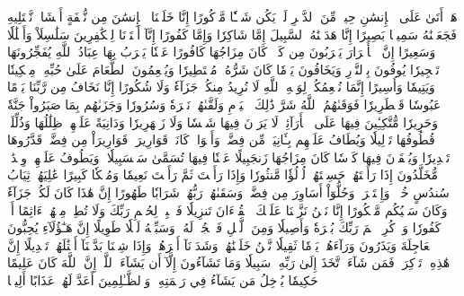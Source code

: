 هَلۡ أَتَىٰ عَلَى ٱلۡإِنسَٰنِ حِينٞ مِّنَ ٱلدَّهۡرِ لَمۡ يَكُن شَيۡـٔٗا مَّذۡكُورًا
إِنَّا خَلَقۡنَا ٱلۡإِنسَٰنَ مِن نُّطۡفَةٍ أَمۡشَاجٖ نَّبۡتَلِيهِ فَجَعَلۡنَٰهُ سَمِيعَۢا بَصِيرًا
إِنَّا هَدَيۡنَٰهُ ٱلسَّبِيلَ إِمَّا شَاكِرٗا وَإِمَّا كَفُورًا
إِنَّآ أَعۡتَدۡنَا لِلۡكَٰفِرِينَ سَلَٰسِلَاْ وَأَغۡلَٰلٗا وَسَعِيرًا
إِنَّ ٱلۡأَبۡرَارَ يَشۡرَبُونَ مِن كَأۡسٖ كَانَ مِزَاجُهَا كَافُورًا
عَيۡنٗا يَشۡرَبُ بِهَا عِبَادُ ٱللَّهِ يُفَجِّرُونَهَا تَفۡجِيرٗا
يُوفُونَ بِٱلنَّذۡرِ وَيَخَافُونَ يَوۡمٗا كَانَ شَرُّهُۥ مُسۡتَطِيرٗا
وَيُطۡعِمُونَ ٱلطَّعَامَ عَلَىٰ حُبِّهِۦ مِسۡكِينٗا وَيَتِيمٗا وَأَسِيرًا
إِنَّمَا نُطۡعِمُكُمۡ لِوَجۡهِ ٱللَّهِ لَا نُرِيدُ مِنكُمۡ جَزَآءٗ وَلَا شُكُورًا
إِنَّا نَخَافُ مِن رَّبِّنَا يَوۡمًا عَبُوسٗا قَمۡطَرِيرٗا
فَوَقَىٰهُمُ ٱللَّهُ شَرَّ ذَٰلِكَ ٱلۡيَوۡمِ وَلَقَّىٰهُمۡ نَضۡرَةٗ وَسُرُورٗا
وَجَزَىٰهُم بِمَا صَبَرُواْ جَنَّةٗ وَحَرِيرٗا
مُّتَّكِـِٔينَ فِيهَا عَلَى ٱلۡأَرَآئِكِۖ لَا يَرَوۡنَ فِيهَا شَمۡسٗا وَلَا زَمۡهَرِيرٗا
وَدَانِيَةً عَلَيۡهِمۡ ظِلَٰلُهَا وَذُلِّلَتۡ قُطُوفُهَا تَذۡلِيلٗا
وَيُطَافُ عَلَيۡهِم بِـَٔانِيَةٖ مِّن فِضَّةٖ وَأَكۡوَابٖ كَانَتۡ قَوَارِيرَا۠
قَوَارِيرَاْ مِن فِضَّةٖ قَدَّرُوهَا تَقۡدِيرٗا
وَيُسۡقَوۡنَ فِيهَا كَأۡسٗا كَانَ مِزَاجُهَا زَنجَبِيلًا
عَيۡنٗا فِيهَا تُسَمَّىٰ سَلۡسَبِيلٗا
۞وَيَطُوفُ عَلَيۡهِمۡ وِلۡدَٰنٞ مُّخَلَّدُونَ إِذَا رَأَيۡتَهُمۡ حَسِبۡتَهُمۡ لُؤۡلُؤٗا مَّنثُورٗا
وَإِذَا رَأَيۡتَ ثَمَّ رَأَيۡتَ نَعِيمٗا وَمُلۡكٗا كَبِيرًا
عَٰلِيَهُمۡ ثِيَابُ سُندُسٍ خُضۡرٞ وَإِسۡتَبۡرَقٞۖ وَحُلُّوٓاْ أَسَاوِرَ مِن فِضَّةٖ وَسَقَىٰهُمۡ رَبُّهُمۡ شَرَابٗا طَهُورًا
إِنَّ هَٰذَا كَانَ لَكُمۡ جَزَآءٗ وَكَانَ سَعۡيُكُم مَّشۡكُورًا
إِنَّا نَحۡنُ نَزَّلۡنَا عَلَيۡكَ ٱلۡقُرۡءَانَ تَنزِيلٗا
فَٱصۡبِرۡ لِحُكۡمِ رَبِّكَ وَلَا تُطِعۡ مِنۡهُمۡ ءَاثِمًا أَوۡ كَفُورٗا
وَٱذۡكُرِ ٱسۡمَ رَبِّكَ بُكۡرَةٗ وَأَصِيلٗا
وَمِنَ ٱلَّيۡلِ فَٱسۡجُدۡ لَهُۥ وَسَبِّحۡهُ لَيۡلٗا طَوِيلًا
إِنَّ هَـٰٓؤُلَآءِ يُحِبُّونَ ٱلۡعَاجِلَةَ وَيَذَرُونَ وَرَآءَهُمۡ يَوۡمٗا ثَقِيلٗا
نَّحۡنُ خَلَقۡنَٰهُمۡ وَشَدَدۡنَآ أَسۡرَهُمۡۖ وَإِذَا شِئۡنَا بَدَّلۡنَآ أَمۡثَٰلَهُمۡ تَبۡدِيلًا
إِنَّ هَٰذِهِۦ تَذۡكِرَةٞۖ فَمَن شَآءَ ٱتَّخَذَ إِلَىٰ رَبِّهِۦ سَبِيلٗا
وَمَا تَشَآءُونَ إِلَّآ أَن يَشَآءَ ٱللَّهُۚ إِنَّ ٱللَّهَ كَانَ عَلِيمًا حَكِيمٗا
يُدۡخِلُ مَن يَشَآءُ فِي رَحۡمَتِهِۦۚ وَٱلظَّـٰلِمِينَ أَعَدَّ لَهُمۡ عَذَابًا أَلِيمَۢا